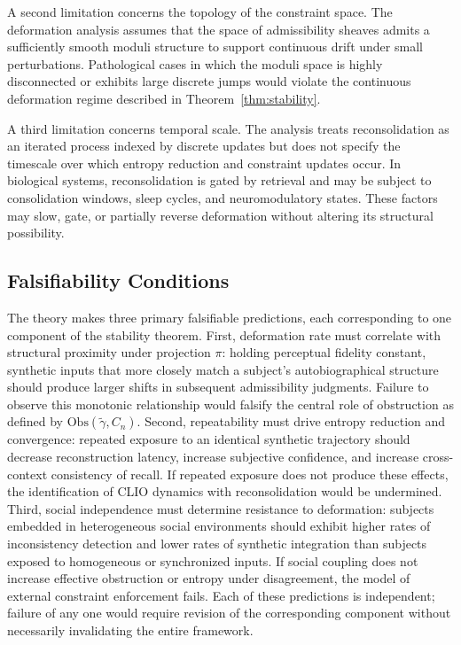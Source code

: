 \documentclass[12pt, a4paper]{article}
\begin{document}
A second limitation concerns the topology of the constraint space. The deformation analysis assumes that the space of admissibility sheaves admits a sufficiently smooth moduli structure to support continuous drift under small perturbations. Pathological cases in which the moduli space is highly disconnected or exhibits large discrete jumps would violate the continuous deformation regime described in Theorem~\ref{thm:stability}.

A third limitation concerns temporal scale. The analysis treats reconsolidation as an iterated process indexed by discrete updates but does not specify the timescale over which entropy reduction and constraint updates occur. In biological systems, reconsolidation is gated by retrieval and may be subject to consolidation windows, sleep cycles, and neuromodulatory states. These factors may slow, gate, or partially reverse deformation without altering its structural possibility.

\subsection{Falsifiability Conditions}

The theory makes three primary falsifiable predictions, each corresponding to one component of the stability theorem. First, deformation rate must correlate with structural proximity under projection $\pi$: holding perceptual fidelity constant, synthetic inputs that more closely match a subject's autobiographical structure should produce larger shifts in subsequent admissibility judgments. Failure to observe this monotonic relationship would falsify the central role of obstruction as defined by $\mathrm{Obs}(\tilde{\gamma}, C_n)$. Second, repeatability must drive entropy reduction and convergence: repeated exposure to an identical synthetic trajectory should decrease reconstruction latency, increase subjective confidence, and increase cross-context consistency of recall. If repeated exposure does not produce these effects, the identification of CLIO dynamics with reconsolidation would be undermined. Third, social independence must determine resistance to deformation: subjects embedded in heterogeneous social environments should exhibit higher rates of inconsistency detection and lower rates of synthetic integration than subjects exposed to homogeneous or synchronized inputs. If social coupling does not increase effective obstruction or entropy under disagreement, the model of external constraint enforcement fails. Each of these predictions is independent; failure of any one would require revision of the corresponding component without necessarily invalidating the entire framework.
\end{document}
